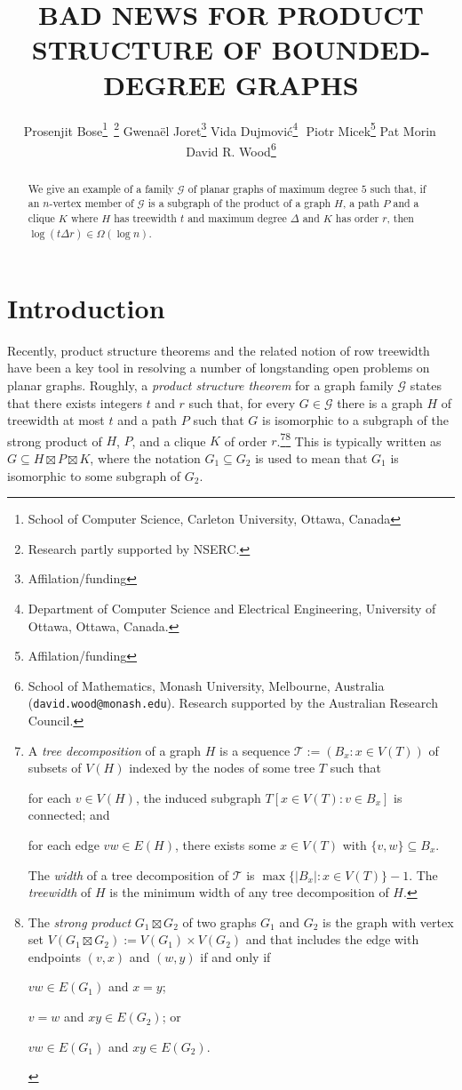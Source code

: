 \documentclass{patmorin}
\title{\MakeUppercase{Bad News for Product Structure of Bounded-Degree Graphs}}
\author{%
  Prosenjit Bose\thanks{School of Computer Science, Carleton University, Ottawa, Canada}\, \thanks{Research partly supported by NSERC.} \quad
  Gwenaël Joret\thanks{Affilation/funding} \quad
  Vida Dujmović\thanks{Department of Computer Science and Electrical Engineering, University of Ottawa, Ottawa, Canada.}\,\, \footnotemark[2] \quad
  Piotr Micek\thanks{Affilation/funding}\quad
  Pat Morin\footnotemark[1]\, \footnotemark[2] \quad
  
  David R. Wood\thanks{School of Mathematics, Monash University, Melbourne, Australia (\texttt{david.wood@monash.edu}). Research supported by the Australian Research Council.
}}
\date{}
\newcommand{\defin}[1]{\emph{\color{brightmaroon}#1}}
\begin{document}
\maketitle
\renewcommand{\E}{\mathbb{E}}
\renewcommand{\Pr}{\mathbb{P}}

\begin{abstract}
  We give an example of a family $\mathcal{G}$ of planar graphs of maximum degree $5$ such that, if an $n$-vertex member of $\mathcal{G}$ is a subgraph of the product of a graph $H$, a path $P$ and a clique $K$ where $H$ has treewidth $t$ and maximum degree $\Delta$ and $K$ has order $r$, then $\log(t\Delta r) \in \Omega(\log n)$.
\end{abstract}

\section{Introduction}

Recently, product structure theorems and the related notion of row treewidth have been a key tool in resolving a number of longstanding open problems on planar graphs.  Roughly, a \defin{product structure theorem} for a graph family $\mathcal{G}$ states that there exists integers $t$ and $r$ such that, for every $G\in\mathcal{G}$ there is a graph $H$ of treewidth at most $t$ and a path $P$ such that $G$ is isomorphic to a subgraph of the strong product of $H$, $P$, and a clique $K$ of order $r$.\footnote{A \defin{tree decomposition} of a graph $H$ is a sequence $\mathcal{T}:=(B_x:x\in V(T))$ of subsets of $V(H)$ indexed by the nodes of some tree $T$ such that
\begin{inparaenum}[(i)]
  \item for each $v\in V(H)$, the induced subgraph $T[x\in V(T):v\in B_x]$ is connected; and
  \item for each edge $vw\in E(H)$, there exists some $x\in V(T)$ with $\{v,w\}\subseteq B_x$.
\end{inparaenum}
The \defin{width} of a tree decomposition of $\mathcal{T}$ is $\max\{|B_x|:x\in V(T)\}-1$. The \defin{treewidth} of $H$ is the minimum width of any tree decomposition of $H$.}\footnote{The \defin{strong product} $G_1\boxtimes G_2$ of two graphs $G_1$ and $G_2$ is the graph with vertex set $V(G_1\boxtimes G_2):=V(G_1)\times V(G_2)$ and that includes the edge with endpoints $(v,x)$ and $(w,y)$ if and only if
\begin{inparaenum}[(i)]
  \item $vw\in E(G_1)$ and $x=y$;
  \item $v=w$ and $xy\in E(G_2)$; or
  \item $vw\in E(G_1)$ and $xy\in E(G_2)$.
\end{inparaenum}
}
This is typically written as $G\subseteq H\boxtimes P\boxtimes K$, where the notation $G_1\subseteq G_2$ is used to mean that $G_1$ is isomorphic to some subgraph of $G_2$.
\end{document}
